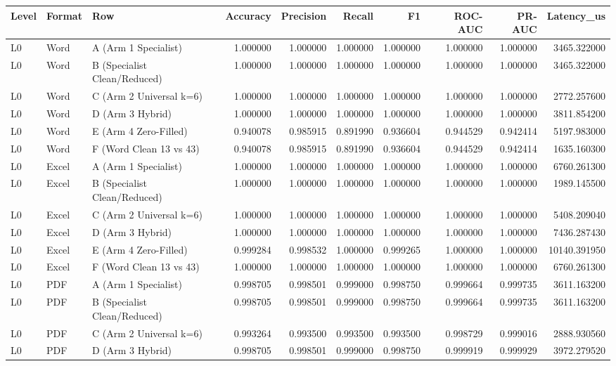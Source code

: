 \begin{tabular}{lllrrrrrrr}
\toprule
Level & Format & Row & Accuracy & Precision & Recall & F1 & ROC-AUC & PR-AUC & Latency_us \\
\midrule
L0 & Word & A (Arm 1 Specialist) & 1.000000 & 1.000000 & 1.000000 & 1.000000 & 1.000000 & 1.000000 & 3465.322000 \\
L0 & Word & B (Specialist Clean/Reduced) & 1.000000 & 1.000000 & 1.000000 & 1.000000 & 1.000000 & 1.000000 & 3465.322000 \\
L0 & Word & C (Arm 2 Universal k=6) & 1.000000 & 1.000000 & 1.000000 & 1.000000 & 1.000000 & 1.000000 & 2772.257600 \\
L0 & Word & D (Arm 3 Hybrid) & 1.000000 & 1.000000 & 1.000000 & 1.000000 & 1.000000 & 1.000000 & 3811.854200 \\
L0 & Word & E (Arm 4 Zero-Filled) & 0.940078 & 0.985915 & 0.891990 & 0.936604 & 0.944529 & 0.942414 & 5197.983000 \\
L0 & Word & F (Word Clean 13 vs 43) & 0.940078 & 0.985915 & 0.891990 & 0.936604 & 0.944529 & 0.942414 & 1635.160300 \\
L0 & Excel & A (Arm 1 Specialist) & 1.000000 & 1.000000 & 1.000000 & 1.000000 & 1.000000 & 1.000000 & 6760.261300 \\
L0 & Excel & B (Specialist Clean/Reduced) & 1.000000 & 1.000000 & 1.000000 & 1.000000 & 1.000000 & 1.000000 & 1989.145500 \\
L0 & Excel & C (Arm 2 Universal k=6) & 1.000000 & 1.000000 & 1.000000 & 1.000000 & 1.000000 & 1.000000 & 5408.209040 \\
L0 & Excel & D (Arm 3 Hybrid) & 1.000000 & 1.000000 & 1.000000 & 1.000000 & 1.000000 & 1.000000 & 7436.287430 \\
L0 & Excel & E (Arm 4 Zero-Filled) & 0.999284 & 0.998532 & 1.000000 & 0.999265 & 1.000000 & 1.000000 & 10140.391950 \\
L0 & Excel & F (Word Clean 13 vs 43) & 1.000000 & 1.000000 & 1.000000 & 1.000000 & 1.000000 & 1.000000 & 6760.261300 \\
L0 & PDF & A (Arm 1 Specialist) & 0.998705 & 0.998501 & 0.999000 & 0.998750 & 0.999664 & 0.999735 & 3611.163200 \\
L0 & PDF & B (Specialist Clean/Reduced) & 0.998705 & 0.998501 & 0.999000 & 0.998750 & 0.999664 & 0.999735 & 3611.163200 \\
L0 & PDF & C (Arm 2 Universal k=6) & 0.993264 & 0.993500 & 0.993500 & 0.993500 & 0.998729 & 0.999016 & 2888.930560 \\
L0 & PDF & D (Arm 3 Hybrid) & 0.998705 & 0.998501 & 0.999000 & 0.998750 & 0.999919 & 0.999929 & 3972.279520 \\

\end{tabular}
